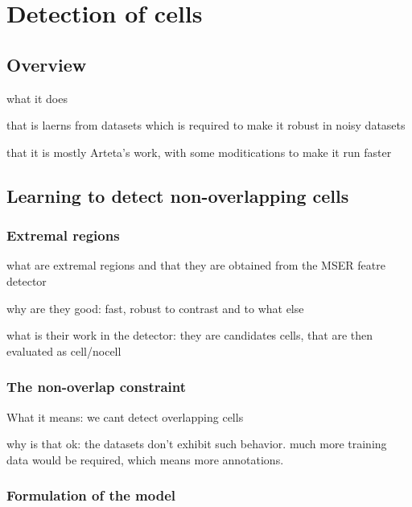 \chapter{Detection of cells }
	\label{chap:cell_detection}
	\section{Overview }
	
	what it does
	
	that is laerns from datasets which is required to make it robust in noisy datasets
	
	that it is mostly Arteta's work, with some moditications to make it run faster
	
	\section{Learning to detect non-overlapping cells }
		
		\subsection{Extremal regions }
		
		what are extremal regions and that they are obtained from the MSER featre detector
		
		why are they good: fast, robust to contrast and to what else
		
		what is their work in the detector: they are candidates cells, that are then evaluated as cell/nocell	
		\subsection{The non-overlap constraint }
		
		What it means: we cant detect overlapping cells
		
		why is that ok: the datasets don't exhibit such behavior. much more training data would be required, which means more annotations.
		
		\subsection{Formulation of the model }
		
